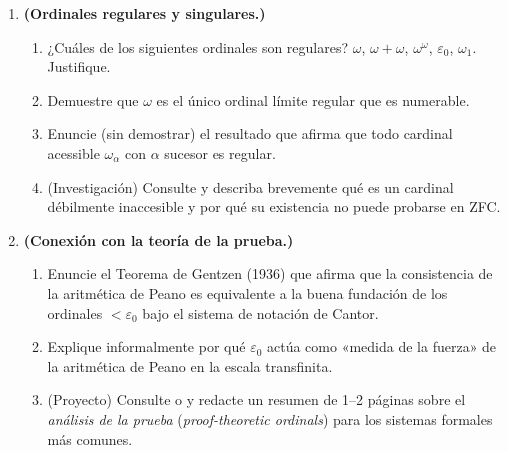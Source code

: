 \begin{enumerate}[leftmargin=2.5em, label=\textbf{\arabic*.}]
  \item \textbf{(Ordinales regulares y singulares.)}
  \begin{enumerate}[label=(\alph*)]
    \item ¿Cuáles de los siguientes ordinales son regulares? $\omega$, $\omega+\omega$, $\omega^\omega$, $\varepsilon_0$, $\omega_1$. Justifique.
    \item Demuestre que $\omega$ es el único ordinal límite regular que es numerable.
    \item Enuncie (sin demostrar) el resultado que afirma que todo cardinal acessible $\omega_\alpha$ con $\alpha$ sucesor es regular.
    \item (Investigación) Consulte \cite{jech2003} y describa brevemente qué es un cardinal débilmente inaccesible y por qué su existencia no puede probarse en ZFC.
  \end{enumerate}

  \item \textbf{(Conexión con la teoría de la prueba.)}
  \begin{enumerate}[label=(\alph*)]
    \item Enuncie el Teorema de Gentzen (1936) que afirma que la consistencia de la aritmética de Peano es equivalente a la buena fundación de los ordinales $< \varepsilon_0$ bajo el sistema de notación de Cantor.
    \item Explique informalmente por qué $\varepsilon_0$ actúa como «medida de la fuerza» de la aritmética de Peano en la escala transfinita.
    \item (Proyecto) Consulte \cite{pohlers1989} o \cite{smorynski1991} y redacte un resumen de 1--2 páginas sobre el \emph{análisis de la prueba} (\textit{proof-theoretic ordinals}) para los sistemas formales más comunes.
  \end{enumerate}


\end{enumerate}
